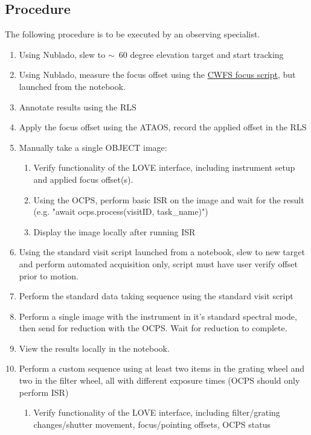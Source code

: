 \subsection{Procedure}
The following procedure is to be executed by an observing specialist.
\begin{enumerate}
	\item Using Nublado, slew to $\sim$~60 degree elevation target and start tracking
	\item Using Nublado, measure the focus offset using the \href{https://github.com/lsst-ts/ts_externalscripts/blob/develop/python/lsst/ts/externalscripts/auxtel/latiss_cwfs_align.py}{CWFS focus script}, but launched from the notebook.
	\item Annotate results using the \gls{RLS}
	\item Apply the focus offset using the ATAOS, record the applied offset in the \gls{RLS}
	\item Manually take a single OBJECT image:
	\begin{enumerate}
		\item Verify functionality of the \gls{LOVE} interface, including instrument setup and applied focus offset(s).
		\item Using the \gls{OCPS}, perform basic \gls{ISR} on the image and wait for the result (e.g. "await ocps.process(visitID, task\_name)")
		\item Display the image locally after running \gls{ISR}
	\end{enumerate}	
	\item Using the standard visit script launched from a notebook, slew to new target and perform automated acquisition only, script must have user verify offset prior to motion.
	\item Perform the standard data taking sequence using the standard visit script
	\item Perform a single image with the instrument in it's standard spectral mode, then send for reduction with the \gls{OCPS}. Wait for reduction to complete.
	\item View the results locally in the notebook.
	\item Perform a custom sequence using at least two items in the grating wheel and two in the filter wheel, all with different exposure times (\gls{OCPS} should only perform ISR)
	\begin{enumerate}
		\item Verify functionality of the \gls{LOVE} interface, including filter/grating changes/shutter movement, focus/pointing offsets, \gls{OCPS} status 

\end{enumerate}
\end{enumerate}
